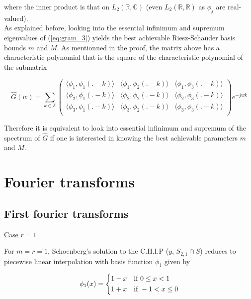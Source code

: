 \documentclass[a4paper, 11pt]{article}
\begin{document}
where the inner product is that on $L_2(\mathbb{R}, \mathbb{C})$ (even  $L_2(\mathbb{R}, \mathbb{R})$ as $\phi_j$ are 
real-valued). \\

As explained before, looking into the essential infinimum and supremum eigenvalues of (\ref{eq:gram_3}) yields the best 
achievable Riesz-Schauder basis bounds $m$ and $M$. As mentionned in the proof, the matrix above has a characteristic 
polynomial that is the square of the characteristic polynomial of the submatrix 

\begin{equation}
  \label{eq:subgram_3}
  \hat{G}(w) =
  \sum_{k \in \mathbb{Z}}
  \begin{pmatrix}
  \langle \phi_1, \phi_1(.-k) \rangle & \langle \phi_1, \phi_2(.-k) \rangle & \langle \phi_1, \phi_3(.-k) \rangle\\
  \langle \phi_2, \phi_1(.-k) \rangle & \langle \phi_2, \phi_2(.-k) \rangle & \langle \phi_2, \phi_3(.-k) \rangle\\
  \langle \phi_3, \phi_1(.-k) \rangle & \langle \phi_3, \phi_2(.-k) \rangle & \langle \phi_3, \phi_3(.-k) \rangle\\
  \end{pmatrix}
  e^{-jwk}
\end{equation}

Therefore it is equivalent to look into essential infinimum and supremum of the spectrum of $\hat{G}$ if one is 
interested in knowing the best achievable parameters $m$ and $M$. 

\section{Fourier transforms}

\subsection{First fourier transforms}

\underline{Case $r=1$}

For $m=r=1$, Schoenberg's solution to the C.H.I.P ($y$, $S_{2, 1} \cap S$) reduces to piecewise linear interpolation 
with basis function $\phi_1$ given by

\begin{equation*}
  \phi_1(x) = \begin{dcases}
    1-x & \text{if } 0 \leq x < 1 \\
    1+x & \text{if } -1 < x \leq 0 
  \end{dcases}
\end{equation*}
\end{document}
